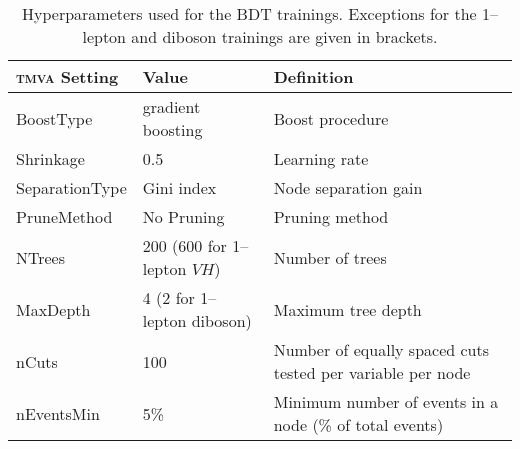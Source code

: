 \begin{table}[htbp]
  \begin{center}
    \begin{tabular}{llp{}}
      \toprule
      {\bfseries \textsc{tmva} Setting} & {\bfseries Value} & {\bfseries Definition} \\
      \midrule
      BoostType & gradient boosting & Boost procedure \\
      Shrinkage & 0.5 & Learning rate \\
      SeparationType & Gini index & Node separation gain \\
      PruneMethod & No Pruning & Pruning method \\
      NTrees & 200 (600 for 1--lepton $VH$) & Number of trees \\
      MaxDepth & 4 (2 for 1--lepton diboson) & Maximum tree depth \\
      nCuts & 100 & Number of equally spaced cuts tested per variable per node \\
      nEventsMin & 5\% & Minimum number of events in a node (\% of total events) \\
      \bottomrule
    \end{tabular}
    \caption[Hyperparameter choices used in the multi-variate
    analysis.]{Hyperparameters used for the BDT trainings. Exceptions for the
      1--lepton \VH and diboson trainings are given in brackets.}
    \label{tab:BDTSetup}
  \end{center}
\end{table}